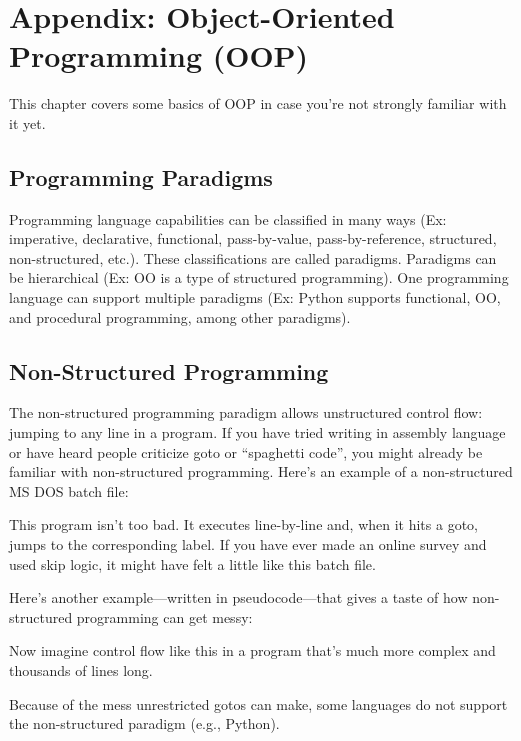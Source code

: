 \nomargins
\chapter{Appendix: Object-Oriented Programming (OOP)}

This chapter covers some basics of OOP in case you're not strongly familiar with it yet.

\section{Programming Paradigms}

Programming language capabilities can be classified in many ways (Ex: imperative, declarative, functional, pass-by-value, pass-by-reference, structured, non-structured, etc.). These classifications are called paradigms. Paradigms can be hierarchical (Ex: OO is a type of structured programming). One programming language can support multiple paradigms (Ex: Python supports functional, OO, and procedural programming, among other paradigms).

\section{Non-Structured Programming}

The non-structured programming paradigm allows unstructured control flow: jumping to any line in a program. If you have tried writing in assembly language or have heard people criticize goto or ``spaghetti code'', you might already be familiar with non-structured programming. Here's an example of a non-structured MS DOS batch file:



\replaceme

This program isn't too bad. It executes line-by-line and, when it hits a goto, jumps to the corresponding label. If you have ever made an online survey and used skip logic, it might have felt a little like this batch file.

Here's another example---written in pseudocode---that gives a taste of how non-structured programming can get messy:



Now imagine control flow like this in a program that's much more complex and thousands of lines long.

Because of the mess unrestricted gotos can make, some languages do not support the non-structured paradigm (e.g., Python).

